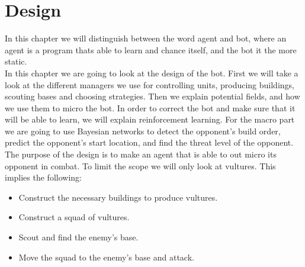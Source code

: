 \chapter{Design}\label{design}
	In this chapter we will distinguish between the word agent and bot, where an agent is a program thats able to learn and chance itself, and the bot it the more static. \\
	
	In this chapter we are going to look at the design of the bot. First we will take a look at the different managers we use for controlling units, producing buildings, scouting bases and choosing strategies. Then we explain potential fields, and how we use them to micro the bot. In order to correct the bot and make sure that it will be able to learn, we will explain reinforcement learning. For the macro part we are going to use Bayesian networks to detect the opponent's build order, predict the opponent's start location, and find the threat level of the opponent.	\\
	The purpose of the design is to make an agent that is able to out micro its opponent in combat. To limit the scope we will only look at vultures. 
	This implies the following:
	\begin{itemize}
		\item Construct the necessary buildings to produce vultures.
		\item Construct a squad of vultures.
		\item Scout and find the enemy's base.
		\item Move the squad to the enemy's base and attack.
	\end{itemize}
	
	
	
	
	
	
	
	
